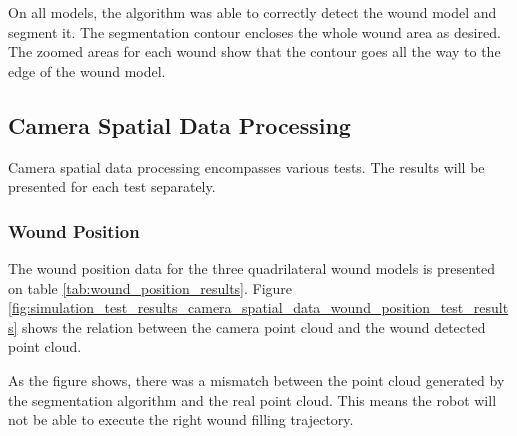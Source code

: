 On all models, the algorithm was able to correctly detect the wound model and segment it. The segmentation contour encloses the whole wound area as desired. The zoomed areas for each wound show that the contour goes all the way to the edge of the wound model.


\subsection{Camera Spatial Data Processing}
\label{subsec:simulated_system_results_camera_spatial_data_processing}

Camera spatial data processing encompasses various tests. The results will be presented for each test separately.

\subsubsection*{Wound Position}
\label{subsubsec:simulated_system_results_camera_spatial_data_processing_position}

The wound position data for the three quadrilateral wound models is presented on table \ref{tab:wound_position_results}. Figure \ref{fig:simulation_test_results_camera_spatial_data_wound_position_test_results} shows the relation between the camera point cloud and the wound detected point cloud.

As the figure shows, there was a mismatch between the point cloud generated by the segmentation algorithm and the real point cloud. This means the robot will not be able to execute the right wound filling trajectory.

